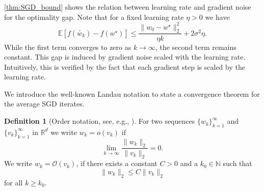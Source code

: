 \documentclass[12pt]{article}
\newtheorem{lemma}[lemma]{Lemma}
\theoremstyle{definition}
\newtheorem{definition}[definition]{Definition}
\numberwithin{equation}{section}
\newcommand{\N}{\mathbb{N}}
\newcommand{\R}{\mathbb{R}}
\newcommand{\E}{\mathbb{E}}
\newcommand{\CF}{\mathcal{F}}
\newcommand{\CO}{\mathcal{O}}
\newcommand{\ev}[1]{\mathbb{E}\left[{#1}\right]}
\newcommand{\norm}[1]{\lVert{#1}\rVert_2}
\begin{document}
\autoref{thm:SGD_bound} shows the relation between learning rate and gradient noise for the optimality gap. Note that for a fixed learning rate $\eta > 0$ we have
\begin{equation*}
  \E [f(\widetilde{w_{k}}) - f(w^\star)] \leq \frac{\norm{w_{0} - w^\star}^2}{\eta k} + 2 \sigma^2 \eta.
\end{equation*}
While the first term converges to zero as $k \rightarrow \infty$, the second term remains constant. This gap is induced by gradient noise scaled with the learning rate. Intuitively, this is verified by the fact that each gradient step is scaled by the learning rate.

We introduce the well-known Landau notation to state a convergence theorem for the average SGD iterates.
\begin{definition}[Order notation, see, e.g., ]
  For two sequences $\{w_k\}_{k=1}^\infty$ and $\{v_k\}_{k=1}^\infty$ in $\R^d$ we write $w_k = o(v_k)$ if
  \begin{equation*}
    \lim_{k \rightarrow \infty} \frac{\norm{w_k}}{\norm{v_k}} = 0.
  \end{equation*}
  We write $w_k = \CO(v_k)$, if there exists a constant $C > 0$ and a $k_0 \in \N$ such that
  \begin{equation*}
    \norm{w_k} \leq C \norm{v_k}
  \end{equation*}
  for all $k \geq k_0$.
\end{definition}
\end{document}

